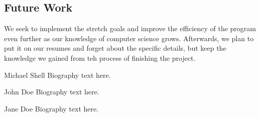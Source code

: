 \documentclass[10pt,conference,onecolumn,compsoc]{IEEEtran}
\begin{document}
\subsection{Future Work}
We seek to implement the stretch goals and improve the efficiency of the program even further as our knowledge of computer science grows. Afterwards, we plan to put it on our resumes and forget about the specific details, but keep the knowledge we gained from teh process of finishing the project.







\begin{IEEEbiography}{Michael Shell}
Biography text here.
\end{IEEEbiography}

\begin{IEEEbiographynophoto}{John Doe}
Biography text here.
\end{IEEEbiographynophoto}


\begin{IEEEbiographynophoto}{Jane Doe}
Biography text here.
\end{IEEEbiographynophoto}





\end{document}
